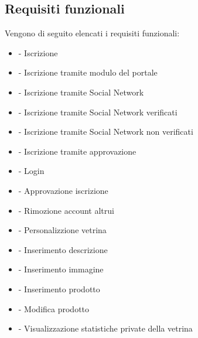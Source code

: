 \subsection{Requisiti funzionali}
\label{sub:requisiti_funzionali}
Vengono di seguito elencati i requisiti funzionali:
\begin{itemize} 
	\item {} - Iscrizione
	\item {} - Iscrizione tramite modulo del portale 	
	\item {} - Iscrizione tramite Social Network	
	\item {} - Iscrizione tramite Social Network verificati
	\item {} - Iscrizione tramite Social Network non verificati	
	\item {} - Iscrizione tramite approvazione
	
	\item {} - Login 
	\countReset 
	
	\item {} - Approvazione iscrizione
	
	\item {} - Rimozione account altrui 
	\countReset
	
	\item {} - Personalizzione vetrina	
	\item {} - Inserimento descrizione	
	\item {} - Inserimento immagine
	\item {} - Inserimento prodotto
	\item {} - Modifica prodotto
	
	\item {} - Visualizzazione statistiche private della vetrina
	\countReset
	

\end{itemize}
